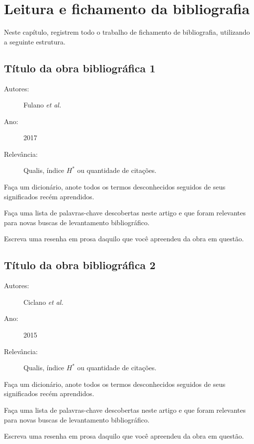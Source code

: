 \chapter{Leitura e fichamento da bibliografia}

Neste capítulo, registrem todo o trabalho de fichamento de bibliografia, utilizando a seguinte estrutura.

\section{Título da obra bibliográfica 1}

\begin{description}
\item[Autores:] Fulano \emph{et al.}
\item[Ano:] 2017
\item[Relevância:] Qualis, índice $H^*$ ou quantidade de citações.
\end{description}

Faça um dicionário, anote todos os termos desconhecidos seguidos de seus significados recém aprendidos.

Faça uma lista de palavras-chave descobertas neste artigo e que foram relevantes para novas buscas de levantamento bibliográfico.

Escreva uma resenha em prosa daquilo que você apreendeu da obra em questão.

\section{Título da obra bibliográfica 2}

\begin{description}
\item[Autores:] Ciclano \emph{et al.}
\item[Ano:] 2015
\item[Relevância:] Qualis, índice $H^*$ ou quantidade de citações.
\end{description}

Faça um dicionário, anote todos os termos desconhecidos seguidos de seus significados recém aprendidos.

Faça uma lista de palavras-chave descobertas neste artigo e que foram relevantes para novas buscas de levantamento bibliográfico.

Escreva uma resenha em prosa daquilo que você apreendeu da obra em questão.